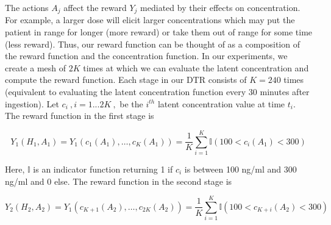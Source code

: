 The actions $A_j$ affect the reward $Y_j$ mediated by their effects on concentration.  For example, a larger dose will elicit larger concentrations which may put the patient in range for longer (more reward) or take them out of range for some time (less reward).  Thus, our reward function can be thought of as a composition of the reward function and the concentration function.  In our experiments, we create a mesh of $2K$ times at which we can evaluate the latent concentration and compute the reward function.  Each stage in our DTR consists of $K=240$ times (equivalent to evaluating the latent concentration function every 30 minutes after ingestion).  Let $ c_i \>,  i=1...2K \>, $ be the $ i^{th}$ latent concentration value at time $ t_i $.  The reward function in the first stage is

\begin{equation}
Y_1(H_1, A_1) = Y_1(c_1(A_1), \dots, c_K(A_1)) = \dfrac{1}{K}\sum_{i=1}^K \mathbb{I}(100  < c_i(A_1) < 300)
\end{equation}

\noindent Here, $ \mathbb{I} $ is an indicator function returning 1 if $c_i$ is between 100 ng/ml and 300 ng/ml and 0 else.
%
\noindent The reward function in the second stage is

\begin{equation}
Y_2(H_2, A_2) = Y_1(c_{K+1}(A_2), \dots, c_{2K}(A_2)) = \dfrac{1}{K}\sum_{i=1}^K \mathbb{I}( 100 < c_{K+i}(A_2) < 300)
\end{equation}

